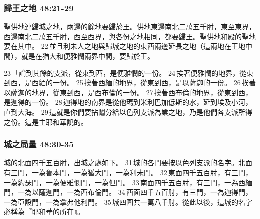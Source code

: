 \subsubsection{歸王之地 48:21-29}
聖供地連歸城之地，兩邊的餘地要歸於王。供地東邊南北二萬五千肘，東至東界，西邊南北二萬五千肘，西至西界，與各份之地相同，都要歸王。聖供地和殿的聖地要在其中。 22 並且利未人之地與歸城之地的東西兩邊延長之地（這兩地在王地中間），就是在猶大和便雅憫兩界中間，要歸於王。

23 「論到其餘的支派，從東到西，是便雅憫的一份。 24 挨著便雅憫的地界，從東到西，是西緬的一份。 25 挨著西緬的地界，從東到西，是以薩迦的一份。 26 挨著以薩迦的地界，從東到西，是西布倫的一份。 27 挨著西布倫的地界，從東到西，是迦得的一份。 28 迦得地的南界是從他瑪到米利巴加低斯的水，延到埃及小河，直到大海。 29 這就是你們要拈鬮分給以色列支派為業之地，乃是他們各支派所得之份。這是主耶和華說的。

\subsubsection{城之局量 48:30-35}
城的北面四千五百肘，出城之處如下。 31 城的各門要按以色列支派的名字。北面有三門，一為魯本門，一為猶大門，一為利未門。 32 東面四千五百肘，有三門，一為約瑟門，一為便雅憫門，一為但門。 33 南面四千五百肘，有三門，一為西緬門，一為以薩迦門，一為西布倫門。 34 西面四千五百肘，有三門，一為迦得門，一為亞設門，一為拿弗他利門。 35 城四圍共一萬八千肘。從此以後，這城的名字必稱為『耶和華的所在』。










